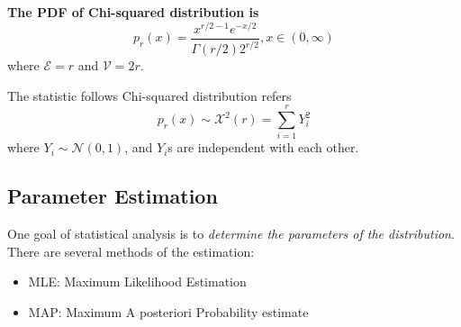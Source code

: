 \documentclass[../main.tex]{subfiles}
\begin{document}
\bigbreak
\textbf{The PDF of Chi-squared distribution is}
\begin{equation}
    \label{Definition: PDF of Chi-squared distribution}
    p_r(x)=
    \frac{x^{r/2-1} e^{-x/2}}{\Gamma(r/2) 2^{r/2}},
    x \in (0, \infty)
\end{equation}
where $\mathcal{E}=r$ and $\mathcal{V}=2r$.

The statistic follows Chi-squared distribution refers
\begin{equation*}
    p_r(x) \sim \mathcal{X}^2(r) = \sum_{i=1}^{r} Y_i^2
\end{equation*}
where $Y_i \sim \mathcal{N}(0, 1)$, and $Y_i$s are independent with each other.

\subsection{Parameter Estimation}
One goal of statistical analysis is to \emph{determine the parameters of the distribution}.
There are several methods of the estimation:
\begin{itemize}
    \item MLE: Maximum Likelihood Estimation
    \item MAP: Maximum A posteriori Probability estimate
\end{itemize}
\end{document}
